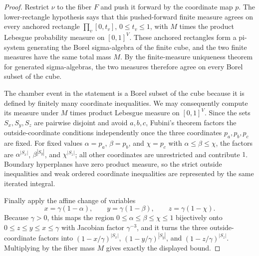 \begin{proof}
Restrict \(\nu\) to the fiber \(F\) and push it forward by the coordinate map
\(p\).  The lower-rectangle hypothesis says that this pushed-forward finite
measure agrees on every anchored rectangle
\(\prod_v[0,t_v]\), \(0\le t_v\le1\), with \(M\) times the product Lebesgue
probability measure on \([0,1]^V\).  These anchored rectangles form a
pi-system generating the Borel sigma-algebra of the finite cube, and the two
finite measures have the same total mass \(M\).  By the finite-measure
uniqueness theorem for generated sigma-algebras, the two measures therefore
agree on every Borel subset of the cube.

The chamber event in the statement is a Borel subset of the cube because it is
defined by finitely many coordinate inequalities.  We may consequently compute
its measure under \(M\) times product Lebesgue measure on \([0,1]^V\).  Since
the sets \(S_x,S_y,S_z\) are pairwise disjoint and avoid \(a,b,c\), Fubini's
theorem factors the outside-coordinate conditions independently once the three
coordinates \(p_a,p_b,p_c\) are fixed.  For fixed values
\(\alpha=p_a\), \(\beta=p_b\), and \(\chi=p_c\) with
\(\alpha\le\beta\le\chi\), the factors are
\(\alpha^{|S_x|}\), \(\beta^{|S_y|}\), and \(\chi^{|S_z|}\); all other
coordinates are unrestricted and contribute \(1\).  Boundary hyperplanes have
zero product measure, so the strict outside inequalities and weak ordered
coordinate inequalities are represented by the same iterated integral.

Finally apply the affine change of variables
\[
x=\gamma(1-\alpha),\qquad y=\gamma(1-\beta),\qquad z=\gamma(1-\chi).
\]
Because \(\gamma>0\), this maps the region
\(0\le\alpha\le\beta\le\chi\le1\) bijectively onto
\(0\le z\le y\le x\le\gamma\) with Jacobian factor \(\gamma^{-3}\), and it
turns the three outside-coordinate factors into
\((1-x/\gamma)^{|S_x|}\), \((1-y/\gamma)^{|S_y|}\), and
\((1-z/\gamma)^{|S_z|}\).  Multiplying by the fiber mass \(M\) gives exactly
the displayed bound.
\end{proof}
